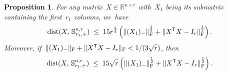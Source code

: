 \documentclass[11pt,a4paper]{article}  %
\newtheorem{proposition}{Proposition}%
\theoremstyle{definition}
\DeclareMathOperator{\dist}{dist}
\newcommand{\RR}{\mathbb{R}}
\newcommand{\col}{r}
\newcommand{\stf}[1]{\mathbb{S}^{#1}}
\newcommand{\fro}{{\scriptstyle{\textnormal{F}}}}
\newcommand{\trs}{{\scriptstyle{\mathsf{T}}}}
\begin{document}
\begin{proposition}\label{prop:errbds}
    For any matrix~$X \in\RR^{n\times \col}$ with~$X_1$ being its submatrix
    containing the first~$\col_1$ columns, we~have
    \begin{equation}
        \label{eq:gerrbds}
        \dist(X,\, \stf{n,\col}_{\col_1,+}) \;\le\;
        15\col^{\frac{3}{4}} \left(\|(X_1)_{-}\|_\fro^{\frac{1}{2}} + \|X^\trs  X - I_\col\|_\fro^{\frac{1}{2}} \right).
    \end{equation}
        Moreover, if~$\|(X_1)_{-}\|_\fro + \|X^\trs X -I_\col\|_\fro < 1/(3\sqrt{\col})$, then
    \begin{equation}
        \label{eq:lerrbds}
        \dist(X,\, \stf{n,\col}_{\col_1,+}) \;\le\;
        15\sqrt{\col} \left( \|(X_1)_{-}\|_\fro^{\frac{1}{2}} + \|X^\trs  X - I_\col\|_\fro^{\frac{1}{2}} \right).
    \end{equation}
\end{proposition}
\end{document}
